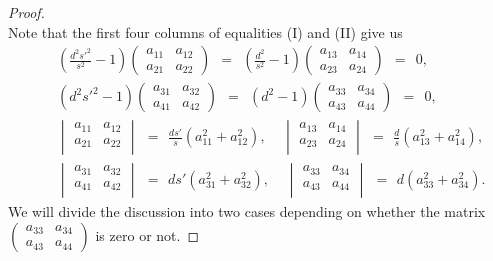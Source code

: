 \documentclass{amsart}
\numberwithin{equation}{section}
\theoremstyle{definition}
\renewcommand{\1}{\mathds{1}}
\renewcommand{\>}{\rightarrow}
\begin{document}
\begin{proof}
\begin{equation}
\end{equation}
Note that the first four columns of equalities (I) and (II) give us
\begin{eqnarray}
&& ( \frac{d^2s'^2}{s^2} -1)  \begin{pmatrix}a_{11} & a_{12} \\ a_{21} & a_{22} \end{pmatrix} \ \ =  \ \   (\frac{d^2}{s^2} -1 )  \begin{pmatrix}a_{13} & a_{14} \\ a_{23} & a_{24} \end{pmatrix} \ \ =  \ \  0,   \label{eq:5.19}\\
&& (d^2s'^2 -1)  \begin{pmatrix}a_{31} & a_{32} \\ a_{41} & a_{42} \end{pmatrix} \ \ =  \ \ ( d^2 -1)  \begin{pmatrix}a_{33} & a_{34} \\ a_{43} & a_{44} \end{pmatrix} \ \ =  \ \ 0 ,  \label{eq:5.20} \\
&& \begin{vmatrix} a_{11} & a_{12} \\ a_{21} & a_{22} \\ \end{vmatrix} \ \, = \ \, \frac{ds'}{s}(a_{11}^2 + a_{12}^2), \ \ \ \ \ \begin{vmatrix} a_{13} & a_{14} \\ a_{23} & a_{24} \\ \end{vmatrix} \ \, = \ \, \frac{d}{s}(a_{13}^2 + a_{14}^2), \label{eq:5.21} \\
&& \begin{vmatrix} a_{31} & a_{32} \\ a_{41} & a_{42} \\ \end{vmatrix} \ \, = \ \, ds' (a_{31}^2 + a_{32}^2), \ \ \ \ \ \begin{vmatrix} a_{33} & a_{34} \\ a_{43} & a_{44} \\ \end{vmatrix} \ \, = \ \, d(a_{33}^2 + a_{34}^2).  \label{eq:5.22}
\end{eqnarray}
We will divide the discussion into two cases depending on whether
the matrix $\begin{pmatrix}a_{33} & a_{34} \\ a_{43} & a_{44} \end{pmatrix} $ is zero or not.


\end{proof}
\end{document}

